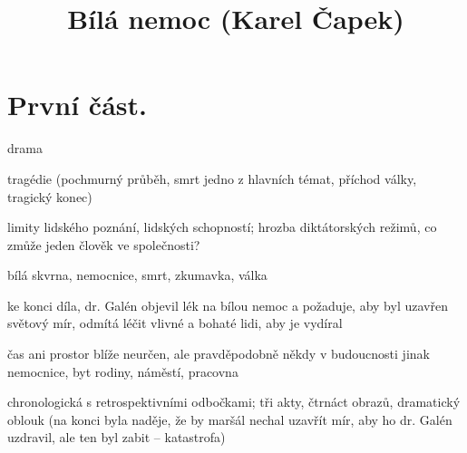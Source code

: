\documentclass{article}
\title{\vspace{-2cm}Bílá nemoc (Karel Čapek)\vspace{-2cm}}
\date{}
\author{}
\begin{document}
\maketitle
\section{První část.}
\begin{description}
    \setlength\itemsep{0.15em}
    \item[druh:] drama
    \item[žánr:] tragédie (pochmurný průběh, smrt jedno z hlavních témat, příchod války, tragický konec)
    \item[téma:] limity lidského poznání, lidských schopností; hrozba diktátorských režimů, co zmůže jeden člověk ve společnosti?
    \item[motivy:] bílá skvrna, nemocnice, smrt, zkumavka, válka
    \item[zařazení výňatku do kontextu díla:] ke konci díla, dr. Galén objevil lék na bílou nemoc a požaduje, aby byl uzavřen
        světový mír, odmítá léčit vlivné a bohaté lidi, aby je vydíral
    \item[časoprostor:] čas ani prostor blíže neurčen, ale pravděpodobně někdy v budoucnosti
        jinak nemocnice, byt rodiny, náměstí, pracovna
    \item[kompoziční výstavba:] chronologická s retrospektivními odbočkami; tři akty, čtrnáct obrazů, dramatický oblouk
    (na konci byla naděje, že by maršál nechal uzavřít mír, aby ho dr. Galén uzdravil, ale ten byl zabit -- katastrofa)
\end{description}
\end{document}
